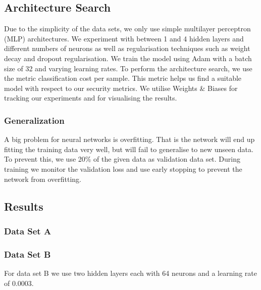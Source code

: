 \documentclass[acmsmall,nonacm]{acmart}
\begin{document}
\subsection{Architecture Search}
Due to the simplicity of the data sets, we only use simple multilayer perceptron (MLP) architectures. We experiment with between 1 and 4 hidden layers and different numbers of neurons as well as regularisation techniques such as weight decay and dropout regularisation. We train the model using Adam with a batch size of 32 and varying learning rates. To perform the architecture search, we use the metric classification cost per sample. This metric helps us find a suitable model with respect to our security metrics. We utilise Weights \& Biases \cite{wandb} for tracking our experiments and for visualising the results. 


\subsubsection*{Generalization}
A big problem for neural networks is overfitting. That is the network will end up fitting the training data very well, but will fail to generalise to new unseen data. To prevent this, we use 20\% of the given data as validation data set. During training we monitor the validation loss and use early stopping to prevent the network from overfitting. 


\subsection{Results}

\subsubsection*{Data Set A}

\subsubsection*{Data Set B}
For data set B we use two hidden layers each with 64 neurons and a learning rate of 0.0003. 
\end{document}

